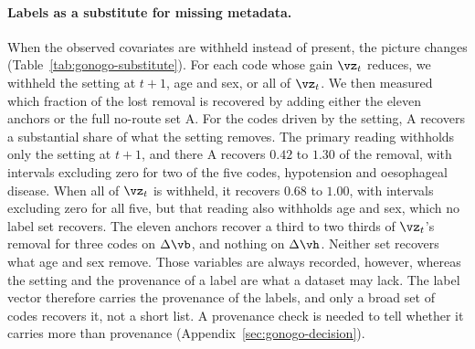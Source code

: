 \paragraph{Labels as a substitute for missing metadata.} When the observed covariates are withheld instead of present, the picture changes (Table~\ref{tab:gonogo-substitute}). For each code whose gain $\vz_t$ reduces, we withheld the setting at $t+1$, age and sex, or all of $\vz_t$. We then measured which fraction of the lost removal is recovered by adding either the eleven anchors or the full no-route set A. For the codes driven by the setting, A recovers a substantial share of what the setting removes. The primary reading withholds only the setting at $t+1$, and there A recovers $0.42$ to $1.30$ of the removal, with intervals excluding zero for two of the five codes, hypotension and oesophageal disease. When all of $\vz_t$ is withheld, it recovers $0.68$ to $1.00$, with intervals excluding zero for all five, but that reading also withholds age and sex, which no label set recovers. The eleven anchors recover a third to two thirds of $\vz_t$'s removal for three codes on $\Delta\vb$, and nothing on $\Delta\vh$. Neither set recovers what age and sex remove. Those variables are always recorded, however, whereas the setting and the provenance of a label are what a dataset may lack. The label vector therefore carries the provenance of the labels, and only a broad set of codes recovers it, not a short list. A provenance check is needed to tell whether it carries more than provenance (Appendix~\ref{sec:gonogo-decision}).

